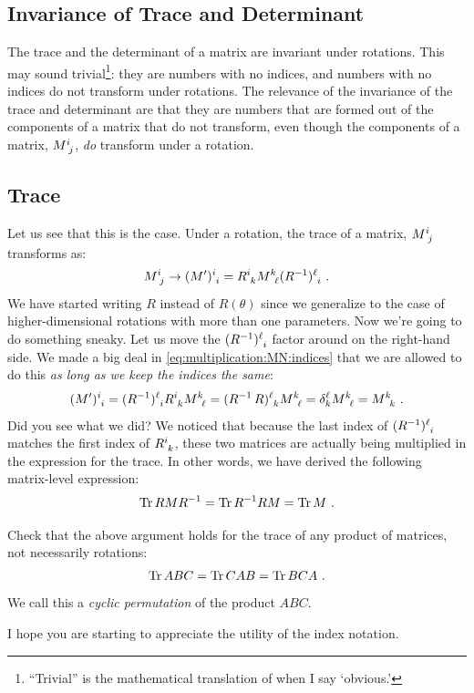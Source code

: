 \documentclass[12pt, oneside]{report}    %
\let\oldsection\section
\def\section{%
  \setcounter{sidenote}{1}%
  \oldsection
}
\begin{document}
\begin{subappendices}
\section{Invariance of Trace and Determinant}

The trace and the determinant of a matrix are invariant under rotations. This may sound trivial\footnote{``Trivial'' is the mathematical translation of when I say `obvious.'}: they are numbers with no indices, and numbers with no indices do not transform under rotations. The relevance of the invariance of the trace and determinant are that they are numbers that are formed out of the components of a matrix that do not transform, even though the components of a matrix, $M\aij{i}{j}$, \emph{do} transform under a rotation. 

\subsection{Trace}

Let us see that this is the case. Under a rotation, the trace of a matrix, $M\aij{i}{j}$ transforms as:
\begin{align}
    M\aij{i}{j} \to (M')\aij{i}{i} = R\aij{i}{k} M\aij{k}{\ell} (R\inv)\aij{\ell}{i} \ .
\end{align}
We have started writing $R$ instead of $R(\theta)$ since we generalize to the case of higher-dimensional rotations with more than one parameters. Now we're going to do something sneaky. Let us move the $(R\inv)\aij{\ell}{i}$ factor around on the right-hand side. We made a big deal in \eqref{eq:multiplication:MN:indices} that we are allowed to do this \emph{as long as we keep the indices the same}:
\begin{align}
    (M')\aij{i}{i}
    =
    (R\inv)\aij{\ell}{i} R\aij{i}{k} M\aij{k}{\ell} 
    = (R\inv\, R)\aij{\ell}{k} M\aij{k}{\ell} 
    = \delta^\ell_k M\aij{k}{\ell} 
    = M\aij{k}{k} \ . 
\end{align}
Did you see what we did? We noticed that because the last index of $(R\inv)\aij{\ell}{i}$ matches the first index of $R\aij{i}{k}$, these two matrices are actually being multiplied in the expression for the trace. In other words, we have derived the following matrix-level expression:
\begin{align}
    \operatorname{\textnormal{Tr}} R M R^{-1} = \operatorname{\textnormal{Tr}} R^{-1} R M = \operatorname{\textnormal{Tr}} M \ .
\end{align}
\begin{exercise}
Check that the above argument holds for the trace of any product of matrices, not necessarily rotations:
\begin{align}
    \operatorname{\textnormal{Tr}} ABC = \operatorname{\textnormal{Tr}} CAB = \operatorname{\textnormal{Tr}} BCA \ .
\end{align}
We call this a \emph{cyclic permutation} of the product $ABC$.
\end{exercise}
I hope you are starting to appreciate the utility of the index notation.


\end{subappendices}
\end{document}
